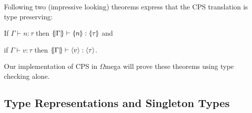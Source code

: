 \documentclass[10pt]{article}
\newcommand{\Wmega}{\ensuremath{\Omega}mega}
\begin{document}
Following two (impressive looking) theorems express that the
CPS translation is type preserving:

If $\Gamma \vdash n : \tau$ then $\lbrace\hspace{-0.2em}\vert {\Gamma} \vert\hspace{-0.2em}\rbrace \vdash \langle\hspace{-0.2em}\vert {n} \vert\hspace{-0.2em}\rangle : \langle\hspace{-0.2em}\vert {\tau} \vert\hspace{-0.2em}\rangle$ and

if $\Gamma \vdash v : \tau$ then $\lbrace\hspace{-0.2em}\vert {\Gamma} \vert\hspace{-0.2em}\rbrace \vdash \langle {v} \rangle : \langle {\tau} \rangle$.

\noindent
Our implementation of CPS in \Wmega{} will prove these theorems using
type checking alone.


\subsection{Type Representations and Singleton Types} \label{single}
\end{document}

